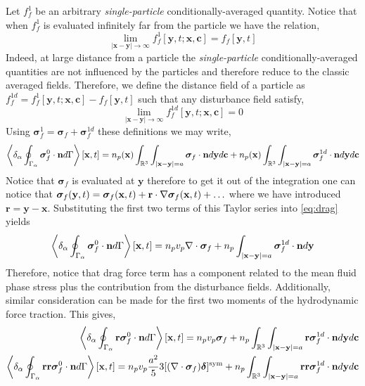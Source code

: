 Let $f^1_f$ be an arbitrary \textit{single-particle} conditionally-averaged quantity. 
Notice that when $f^1_f$ is evaluated infinitely far from the particle we have the relation, 
\begin{equation*}
    \lim_{|\textbf{x} - \textbf{y}| \to \infty}  f^1_f [\textbf{y},t;\textbf{x},\textbf{c}] = f_f [\textbf{y},t]
\end{equation*}
Indeed, at large distance from a particle the \textit{single-particle} conditionally-averaged quantities are not influenced by the particles and therefore reduce to the classic averaged fields. 
Therefore, we define the distance field of a particle as $f^{1d}_f = f^1_f [\textbf{y},t;\textbf{x},\textbf{c}]  - f_f[\textbf{y},t]$ such that any disturbance field satisfy, 
\begin{equation*}
    \lim_{|\textbf{x} - \textbf{y}| \to \infty}  f^{1d}_f [\textbf{y},t;\textbf{x},\textbf{c}] = 0 
\end{equation*}
Using  $\bm\sigma_f^1 = \bm\sigma_f + \bm\sigma_f^{1d}$ these definitions we may write, 
\begin{equation}
    \left<\delta_\alpha \oint_{\Gamma_\alpha} \bm\sigma_f^0\cdot\textbf{n} d\Gamma\right>[\textbf{x},t]
    =
    n_p(\textbf{x})
    \int_{\mathbb{R}^3}
    \int_{|\textbf{x}-\textbf{y}|=a}
    \bm\sigma_f
    \cdot \textbf{n}
    d\textbf{y}
    d\textbf{c}
    + n_p(\textbf{x})
    \int_{\mathbb{R}^3}
    \int_{|\textbf{x}-\textbf{y}|=a}
    \bm\sigma_f^{1d}
    \cdot \textbf{n}
    d\textbf{y}
    d\textbf{c}
    \label{eq:drag}
\end{equation}
Notice that $\bm\sigma_f$ is evaluated at $\textbf{y}$ therefore to get it out of the integration one can notice that $\bm\sigma_f(\textbf{y},t) = \bm\sigma_f(\textbf{x},t) + \textbf{r}\cdot \mathbf{\nabla}\bm\sigma_f(\textbf{x},t)+ \ldots$
where we have introduced $\textbf{r} = \textbf{y} - \textbf{x}$. 
Substituting the first two terms of this Taylor series into \ref{eq:drag} yields
\begin{equation}
    \left<\delta_\alpha \oint_{\Gamma_\alpha} \bm\sigma_f^0\cdot\textbf{n} d\Gamma\right>[\textbf{x},t]
    =
    n_p v_p 
    \mathbf{\nabla}\cdot\bm\sigma_f
    +
    n_p 
    \int_{|\textbf{x}-\textbf{y}|=a}
    \bm\sigma_f^{1d} \cdot \textbf{n}
    d\textbf{y}
    \label{eq:drag_final}
\end{equation}
Therefore, notice that drag force term has a component related to the mean fluid phase stress plus the contribution from the disturbance fields. 
Additionally, similar consideration can be made for the first two moments of the hydrodynamic force traction. 
This gives, 
\begin{align}
    \left<\delta_\alpha \oint_{\Gamma_\alpha} \textbf{r}\bm\sigma_f^0\cdot\textbf{n} d\Gamma\right>[\textbf{x},t]
    =
    n_p v_p \bm\sigma_f
    +
    n_p 
    \int_{\mathbb{R}^3}
    \int_{|\textbf{x}-\textbf{y}|=a}
    \textbf{r}\bm\sigma_f^{1d} \cdot \textbf{n}
    d\textbf{y}
    d\textbf{c}
    \\
    \left<\delta_\alpha \oint_{\Gamma_\alpha} \textbf{rr}\bm\sigma_f^0\cdot\textbf{n} d\Gamma\right>[\textbf{x},t]
    =
    n_pv_p  \frac{a^2}{5} 3 [(\mathbf{\nabla}\cdot \bm\sigma_f)\bm\delta]^\text{sym}
    +
    n_p 
    \int_{\mathbb{R}^3}
    \int_{|\textbf{x}-\textbf{y}|=a}
    \textbf{rr}\bm\sigma_f^{1d} \cdot \textbf{n}
    d\textbf{y}
    d\textbf{c}
    \\
\end{align}
